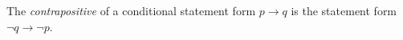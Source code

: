 \guard



\begin{defn}
\label{defn:contrapositive}
  The \emph{contrapositive} of a conditional statement form $p\rightarrow q$ is the statement form $\neg q \rightarrow \neg p$.
\end{defn}
